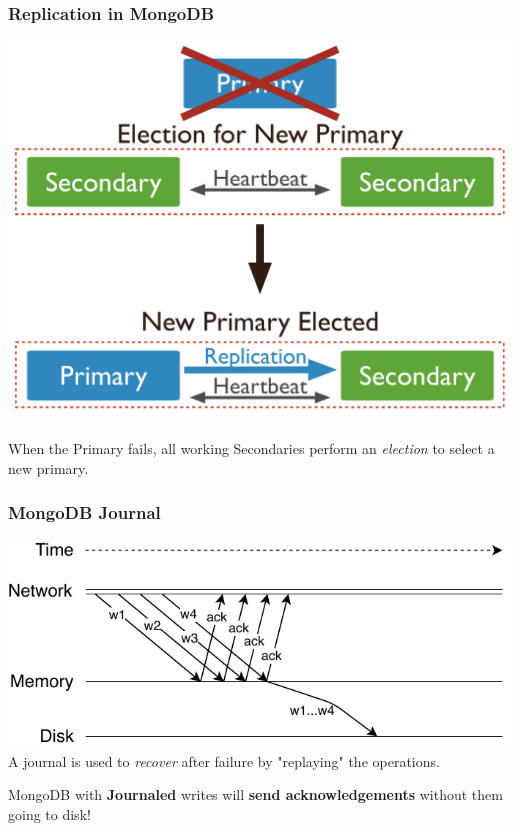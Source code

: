 \documentclass[numfooter,sectionpages,protectFrameTitle, progressbar, cblock, valigncolumns, addlogo]{beamer}
\begin{document}
\begin{frame}
    \frametitle{Replication in MongoDB}
    
    \centering
    \includegraphics[height=.625\textheight]{../images/mongodbelection.png}

    When the Primary fails, all working Secondaries perform an \textit{election} to select a new primary.
\end{frame}

\begin{frame}
    \frametitle{MongoDB Journal}

    \begin{center}
    \includegraphics[height=0.5\textheight]{../images/Buffering1.pdf}
    A journal is used to \textit{recover} after failure by "replaying" the operations.

    MongoDB with \textbf{Journaled} writes will \textbf{send acknowledgements} without them going to disk!

    \end{center}

\end{frame}
\end{document}
